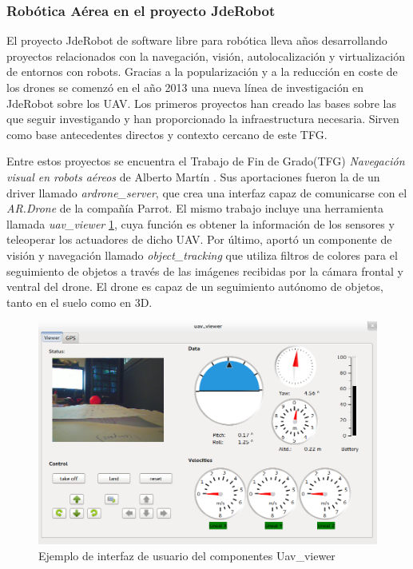 \subsubsection{Robótica Aérea en el proyecto JdeRobot}

El proyecto JdeRobot de software libre para robótica lleva años desarrollando proyectos relacionados con la navegación, visión, autolocalización y virtualización de entornos con robots. Gracias a la popularización y a la reducción en coste de los drones se comenzó en el año 2013 una nueva línea de investigación en JdeRobot sobre los UAV. Los primeros proyectos han creado las bases sobre las que seguir investigando y han proporcionado la infraestructura necesaria. Sirven como base antecedentes directos y contexto cercano de este TFG.

Entre estos proyectos se encuentra el Trabajo de Fin de Grado(TFG) \textit{Navegación visual en robots aéreos} de Alberto Martín \cite{AlbertoMartin}. Sus aportaciones fueron la de un driver llamado \textit{ardrone\_server}, que crea una interfaz capaz de comunicarse con el \textit{AR.Drone} de la compañía Parrot. El mismo trabajo incluye una herramienta llamada \textit{uav\_viewer} \ref{FIG:11_uav_viewer}, cuya función es obtener la información de los sensores y teleoperar los actuadores de dicho UAV. Por último, aportó un componente de visión y navegación llamado \textit{object\_tracking} que utiliza filtros de colores para el seguimiento de objetos a través de las imágenes recibidas por la cámara frontal y ventral del drone. El drone es  capaz de un seguimiento autónomo de objetos, tanto en el suelo como en 3D.

\begin{figure}[hbtp]
	\centering
	\includegraphics[scale=0.35]{imag/uav_viewer.png}
	\caption{Ejemplo de interfaz de usuario del componentes Uav\_viewer}	
	\label{FIG:11_uav_viewer}
\end{figure}


